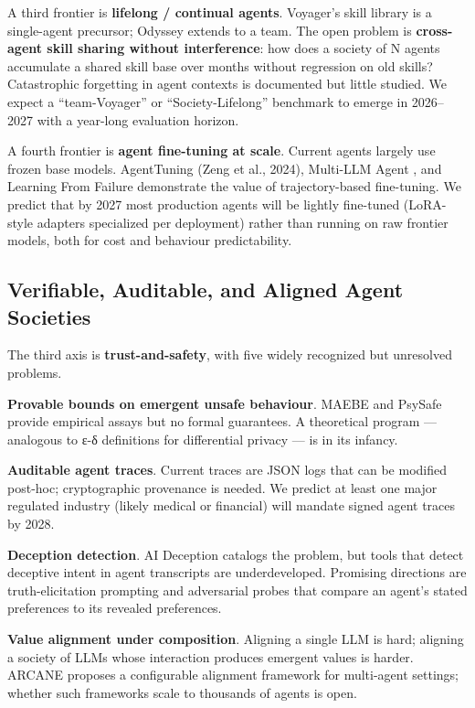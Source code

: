 \documentclass{article}
\begin{document}
A third frontier is \textbf{lifelong / continual agents}. Voyager's skill library is a single-agent precursor; Odyssey extends to a team. The open problem is \textbf{cross-agent skill sharing without interference}: how does a society of N agents accumulate a shared skill base over months without regression on old skills? Catastrophic forgetting in agent contexts is documented but little studied. We expect a ``team-Voyager'' or ``Society-Lifelong'' benchmark to emerge in 2026--2027 with a year-long evaluation horizon.

A fourth frontier is \textbf{agent fine-tuning at scale}. Current agents largely use frozen base models. AgentTuning (Zeng et al., 2024), Multi-LLM Agent \citep{shen2024smallllmsareweakto}, and Learning From Failure \citep{wang20242024} demonstrate the value of trajectory-based fine-tuning. We predict that by 2027 most production agents will be lightly fine-tuned (LoRA-style adapters specialized per deployment) rather than running on raw frontier models, both for cost and behaviour predictability.

\subsection{Verifiable, Auditable, and Aligned Agent Societies}\label{verifiable-auditable-and-aligned-agent-societies}

The third axis is \textbf{trust-and-safety}, with five widely recognized but unresolved problems.

\textbf{Provable bounds on emergent unsafe behaviour}. MAEBE \citep{erisken2025maebemultiagenteme} and PsySafe \citep{zhang2024psysafeacomprehens} provide empirical assays but no formal guarantees. A theoretical program --- analogous to ε-δ definitions for differential privacy --- is in its infancy.

\textbf{Auditable agent traces}. Current traces are JSON logs that can be modified post-hoc; cryptographic provenance is needed. We predict at least one major regulated industry (likely medical or financial) will mandate signed agent traces by 2028.

\textbf{Deception detection}. AI Deception \citep{park2024aideceptionasurvey} catalogs the problem, but tools that detect deceptive intent in agent transcripts are underdeveloped. Promising directions are truth-elicitation prompting and adversarial probes that compare an agent's stated preferences to its revealed preferences.

\textbf{Value alignment under composition}. Aligning a single LLM is hard; aligning a society of LLMs whose interaction produces emergent values is harder. ARCANE \citep{masters2025arcaneamultiagentf} proposes a configurable alignment framework for multi-agent settings; whether such frameworks scale to thousands of agents is open.
\end{document}
